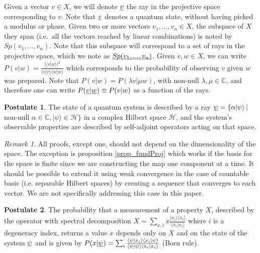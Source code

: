 \documentclass[aps,prl,amsmath,amssymb,twocolumn,nofootinbib]{revtex4}
\theoremstyle{plain}
\theoremstyle{definition}
\newtheorem{post}{Postulate}[]
\theoremstyle{remark}
\newtheorem*{remark}{Remark}
\newcommand{\pj}[1] {\underbar{$#1$}}
\def\>{\rangle}
\def\<{\langle}
\begin{document}
Given a vector $v \in X$, we will denote $\pj{v}$ the ray in the
projective space corresponding to $v$. Note that $\pj{v}$ denotes a
quantum state, without having picked a modulus or phase. Given two or
more vectors $v_1, ..., v_n \in X$, the subspace of $X$ they span
(i.e.~all the vectors reached by linear combinations) is noted by
$Sp(v_1, ..., v_n)$. Note that this subspace will correspond to a set
of rays in the projective space, which we note as $\pj{Sp(v_1, ...,
  v_n)}$. Given $v,w \in X$, we can write $P(v|w) = \frac{|\< v | w
  \>|^2}{\< v | v \>\< w | w \>}$ which corresponds to the probability
of observing $v$ given $w$ was prepared. Note that $P(v|w) = P(\lambda
v| \mu w)$, with non-null $\lambda,\mu\in{\mathbb C}$, and therefore
one can write $P(\pj{v} | \pj{w})\equiv P(v|w)$ as a function of the
rays.


\begin{post}\label{post_state}
  The state of a quantum system is described by a ray $\pj{\psi} = \{
  \alpha |\psi\> \, |$ non-null $\alpha \in
  \mathbb{C},|\psi\>\in\mathcal{H}\}$ in a complex Hilbert space
  $\mathcal{H}$, and the system's observable properties are described
  by self-adjoint operators acting on that space. %
\end{post}

\begin{remark}
  All proofs, except one, should not depend on the dimensionality of
  the space. The exception is proposition \ref{prop_fundProj} which
  works if the basis for the space is finite since we are constructing
  the map one component at a time. It should be possible to extend it
  using weak convergence in the case of countable basis
  (i.e. separable Hilbert spaces) by creating a sequence that
  converges to each vector. We are not specifically addressing this
  case in this paper.
\end{remark}

\begin{post}\label{post_measurements}
The probability that a measurement of a property $X$, described by the operator with
spectral decomposition $X = \sum_{x,i }x \frac{| x_i \> \< x_i |}{\< x_i | x_i \>}$  where $i$ is a degeneracy index, returns a value $x$ depends only on $X$ and on the state of the system $\pj{\psi}$ and is given by $P(x|\pj{\psi})=\sum_i \frac{\<\psi| x_i \> \< x_i |\psi\>}{\< \psi | \psi \>\< x_i | x_i \>}$
(Born rule).\end{post}
\end{document}
